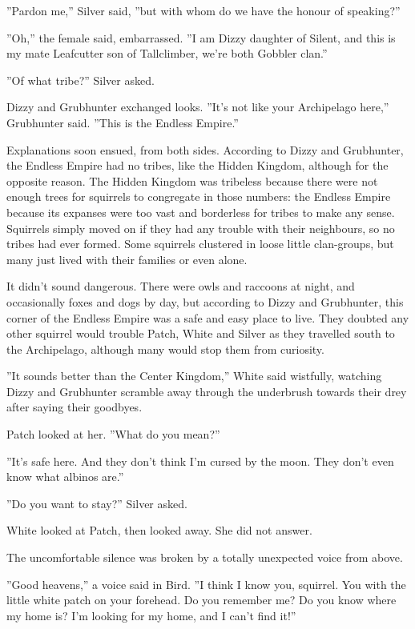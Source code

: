 \documentclass[12pt]{book}
\begin{document}
''Pardon me,'' Silver said, ''but with whom do we have the honour of speaking?''

''Oh,'' the female said, embarrassed. ''I am Dizzy daughter of Silent, and this is my mate Leafcutter son of Tallclimber, we're both Gobbler clan.''

''Of what tribe?'' Silver asked.

Dizzy and Grubhunter exchanged looks. ''It's not like your Archipelago here,'' Grubhunter said. ''This is the Endless Empire.''

Explanations soon ensued, from both sides. According to Dizzy and Grubhunter, the Endless Empire had no tribes, like the Hidden Kingdom, although for the opposite reason. The Hidden Kingdom was tribeless because there were not enough trees for squirrels to congregate in those numbers: the Endless Empire because its expanses were too vast and borderless for tribes to make any sense. Squirrels simply moved on if they had any trouble with their neighbours, so no tribes had ever formed. Some squirrels clustered in loose little clan-groups, but many just lived with their families or even alone.

It didn't sound dangerous. There were owls and raccoons at night, and occasionally foxes and dogs by day, but according to Dizzy and Grubhunter, this corner of the Endless Empire was a safe and easy place to live. They doubted any other squirrel would trouble Patch, White and Silver as they travelled south to the Archipelago, although many would stop them from curiosity.

''It sounds better than the Center Kingdom,'' White said wistfully, watching Dizzy and Grubhunter scramble away through the underbrush towards their drey after saying their goodbyes.

Patch looked at her. ''What do you mean?''

''It's safe here. And they don't think I'm cursed by the moon. They don't even know what albinos are.''

''Do you want to stay?'' Silver asked.

White looked at Patch, then looked away. She did not answer.

The uncomfortable silence was broken by a totally unexpected voice from above.

''Good heavens,'' a voice said in Bird. ''I think I know you, squirrel. You with the little white patch on your forehead. Do you remember me? Do you know where my home is? I'm looking for my home, and I can't find it!''
\end{document}
